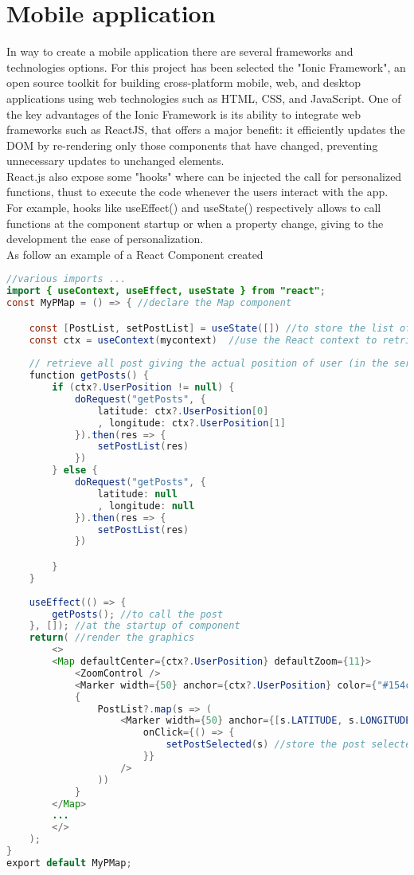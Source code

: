 \documentclass[conference]{IEEEtran}
\begin{document}
\section{Mobile application}
In way to create a mobile application there are several frameworks and technologies options. For this project has been selected the "Ionic Framework", an open source toolkit for building cross-platform mobile, web, and desktop applications using web technologies such as HTML, CSS, and JavaScript.
One of the key advantages of the Ionic Framework is its ability to integrate  web frameworks such as ReactJS, that offers a major benefit: it efficiently updates the DOM by re-rendering only those components that have changed, preventing unnecessary updates to unchanged elements.\\
React.js also expose some "hooks" where can be injected the call for personalized functions, thust to execute the code whenever the users interact with the app.
For example, hooks like useEffect() and useState() respectively allows to call functions at the component startup or when a property change, giving to the development the ease of personalization.
\\
As follow an example of a React Component created
\begin{lstlisting}[language=Java, caption=Map component snippet]
//various imports ...
import { useContext, useEffect, useState } from "react";
const MyPMap = () => { //declare the Map component

    const [PostList, setPostList] = useState([]) //to store the list of posts
    const ctx = useContext(mycontext)  //use the React context to retrieve data of other components
    
    // retrieve all post giving the actual position of user (in the server it will be computed the nearest posts)
    function getPosts() {
        if (ctx?.UserPosition != null) {
            doRequest("getPosts", {
                latitude: ctx?.UserPosition[0]
                , longitude: ctx?.UserPosition[1]
            }).then(res => {
                setPostList(res)
            })
        } else {
            doRequest("getPosts", {
                latitude: null
                , longitude: null
            }).then(res => {
                setPostList(res)
            })

        }
    }
    
    useEffect(() => {
        getPosts(); //to call the post
    }, []); //at the startup of component
    return( //render the graphics
        <>
        <Map defaultCenter={ctx?.UserPosition} defaultZoom={11}>
            <ZoomControl />
            <Marker width={50} anchor={ctx?.UserPosition} color={"#154c79"} />
            {
                PostList?.map(s => (
                    <Marker width={50} anchor={[s.LATITUDE, s.LONGITUDE]} color={(s?.MEDIATYPE?.length > 0) ? '#d6c531' : '#f23c3c'}
                        onClick={() => {
                            setPostSelected(s) //store the post selected to open it in the opportuned component (viewPost)
                        }}
                    />
                ))
            }
        </Map>
        ...
        </>
    );
}
export default MyPMap;
\end{lstlisting}
\end{document}
